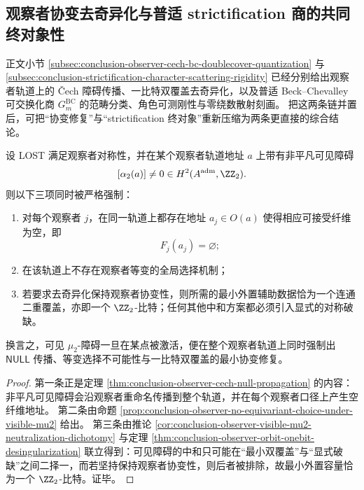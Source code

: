 \subsection{观察者协变去奇异化与普适 strictification 商的共同终对象性}

正文小节 \ref{subsec:conclusion-observer-cech-bc-doublecover-quantization}
与 \ref{subsec:conclusion-strictification-character-scattering-rigidity}
已经分别给出观察者轨道上的 Čech 障碍传播、一比特双覆盖去奇异化，以及普适 Beck--Chevalley 可交换化商
\(
G_m^{\mathrm{BC}}
\)
的范畴分类、角色可测刚性与零绕数散射刻画。
把这两条链并置后，可把“协变修复”与“strictification 终对象”重新压缩为两条更直接的综合结论。

\begin{theorem}[观察者协变体系中的一比特去奇异化精确性]\label{thm:derived-observer-onebit-desingularization-exactness}
设 LOST 满足观察者对称性，并在某个观察者轨道地址 \(a\) 上带有非平凡可见障碍
\[
[\alpha_2(a)]\neq 0\in H^2(A^{\mathrm{adm}},\ZZ_2).
\]
则以下三项同时被严格强制：
\begin{enumerate}
\normalfont
  \item 对每个观察者 \(j\)，在同一轨道上都存在地址 \(a_j\in O(a)\) 使得相应可接受纤维为空，即
  \[
  F_j(a_j)=\varnothing;
  \]
  \item 在该轨道上不存在观察者等变的全局选择机制；
  \item 若要求去奇异化保持观察者协变性，则所需的最小外置辅助数据恰为一个连通二重覆盖，亦即一个 \(\ZZ_2\)-比特；任何其他中和方案都必须引入显式的对称破缺。
\end{enumerate}
换言之，可见 \(\mu_2\)-障碍一旦在某点被激活，便在整个观察者轨道上同时强制出 \(\mathsf{NULL}\) 传播、等变选择不可能性与一比特双覆盖的最小协变修复。
\end{theorem}

\begin{proof}
第一条正是定理 \ref{thm:conclusion-observer-cech-null-propagation} 的内容：非平凡可见障碍会沿观察者重命名传播到整个轨道，并在每个观察者口径上产生空纤维地址。
第二条由命题 \ref{prop:conclusion-observer-no-equivariant-choice-under-visible-mu2} 给出。
第三条由推论 \ref{cor:conclusion-observer-visible-mu2-neutralization-dichotomy}
与定理 \ref{thm:conclusion-observer-orbit-onebit-desingularization} 联立得到：可见障碍的中和只可能在“最小双覆盖”与“显式破缺”之间二择一，而若坚持保持观察者协变性，则后者被排除，故最小外置容量恰为一个 \(\ZZ_2\)-比特。证毕。
\end{proof}

